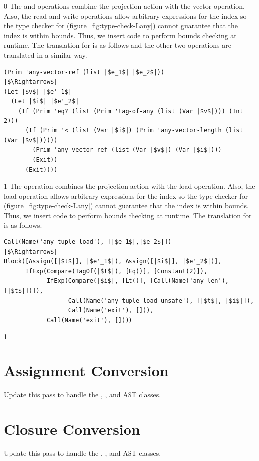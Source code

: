 \documentclass[7x10]{TimesAPriori_MIT}%
\def\racketEd{0}
\def\pythonEd{1}
\def\edition{0}
\numberwithin{theorem}{chapter}
\numberwithin{definition}{chapter}
\numberwithin{equation}{chapter}
\begin{document}
{\if\edition\racketEd    
The  and  operations
combine the projection action with the vector operation.  Also, the
read and write operations allow arbitrary expressions for the index so
the type checker for \LangAny{} (figure~\ref{fig:type-check-Lany})
cannot guarantee that the index is within bounds. Thus, we insert code
to perform bounds checking at runtime. The translation for
 is as follows and the other two operations are
translated in a similar way.
\begin{center}
\begin{minipage}{0.95\textwidth}
\begin{lstlisting}
(Prim 'any-vector-ref (list |$e_1$| |$e_2$|))
|$\Rightarrow$|
(Let |$v$| |$e'_1$|
  (Let |$i$| |$e'_2$|
    (If (Prim 'eq? (list (Prim 'tag-of-any (list (Var |$v$|))) (Int 2)))
      (If (Prim '< (list (Var |$i$|) (Prim 'any-vector-length (list (Var |$v$|)))))
        (Prim 'any-vector-ref (list (Var |$v$|) (Var |$i$|)))
        (Exit))
      (Exit))))
\end{lstlisting}
\end{minipage}
\end{center}
\fi}
%
{\if\edition\pythonEd
%
The  operation combines the projection action
with the load operation.  Also, the load operation allows arbitrary
expressions for the index so the type checker for \LangAny{}
(figure~\ref{fig:type-check-Lany}) cannot guarantee that the index is
within bounds. Thus, we insert code to perform bounds checking at
runtime. The translation for  is as follows.

\begin{lstlisting}
Call(Name('any_tuple_load'), [|$e_1$|,|$e_2$|])
|$\Rightarrow$|
Block([Assign([|$t$|], |$e'_1$|), Assign([|$i$|], |$e'_2$|)],
      IfExp(Compare(TagOf(|$t$|), [Eq()], [Constant(2)]),
            IfExp(Compare(|$i$|, [Lt()], [Call(Name('any_len'), [|$t$|])]),
                  Call(Name('any_tuple_load_unsafe'), [|$t$|, |$i$|]),
                  Call(Name('exit'), [])),
            Call(Name('exit'), [])))
\end{lstlisting}
\fi}


{\if\edition\pythonEd

\section{Assignment Conversion}
\label{sec:convert-assignments-Lany}

Update this pass to handle the , , and
 AST classes.

\section{Closure Conversion}
\label{sec:closure-conversion-Lany}

Update this pass to handle the , , and
 AST classes.

\fi}
\end{document}
